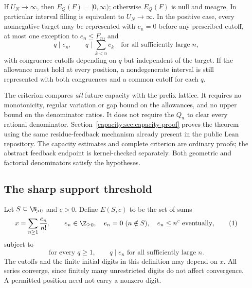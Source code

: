 \documentclass[11pt]{article}
\begin{document}
\begin{theorem}\label{capacity:thm:capacity}
If $U_N\to\infty$, then $E_Q(F)=[0,\infty)$; otherwise $E_Q(F)$ is null
and meagre. In particular interval filling is equivalent to $U_N\to\infty$.
In the positive case, every nonnegative target may be represented with
$e_n=0$ before any prescribed cutoff, at most one exception to $e_n\le F_n$,
and
\[
 q\mid e_n,\qquad q\mid\sum_{k<n}e_k
 \quad\text{for all sufficiently large }n,
\]
with congruence cutoffs depending on $q$ but independent of the target.
If the allowance must hold at every position, a nondegenerate interval is
still represented with both congruences and a common cutoff for each $q$.
\end{theorem}
The criterion compares \emph{all} future capacity with the prefix lattice.
It requires no monotonicity, regular variation or gap bound on the allowances,
and no upper bound on the denominator ratios. It does not require the $Q_n$
to clear every rational denominator. Section~\ref{capacity:sec:capacity-proof} proves
the theorem using the same residue-feedback mechanism already present in
the public Lean repository. The capacity estimates and complete criterion
are ordinary proofs; the abstract feedback endpoint is kernel-checked
separately. Both geometric and factorial denominators satisfy the hypotheses.

\subsection{The sharp support threshold}
Let $S\subseteq\N_{\!>0}$ and $c>0$. Define $E(S,c)$ to be the set of sums
\[
 x=\sum_{n\ge1}\frac{e_n}{n!},\qquad e_n\in\Z_{\ge0},\quad
 e_n=0\ (n\notin S),\quad e_n\le n^c\text{ eventually},
 \tag{1}\label{capacity:eq:class}
\]
subject to
\[
 \text{for every }q\ge1,\qquad q\mid e_n\text{ for all sufficiently large }n.
 \tag{2}\label{capacity:eq:congruence}
\]
The cutoffs and the finite initial digits in this definition may depend on $x$.
All series converge, since finitely many unrestricted digits do not affect
convergence. A permitted position need not carry a nonzero digit.
\end{document}

